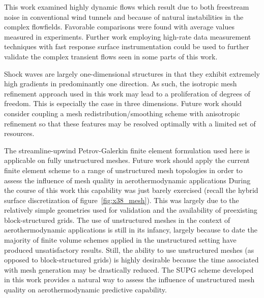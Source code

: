 This work examined highly dynamic flows which result due to both freestream noise in conventional wind tunnels and because of natural instabilities in the complex flowfields.  Favorable comparisons were found with average values measured in experiments.  Further work employing high-rate data measurement techniques with fast response surface instrumentation could be used to further validate the complex transient flows seen in some parts of this work.

Shock waves are largely one-dimensional structures in that they exhibit extremely high gradients in predominantly one direction.  As such, the isotropic mesh refinement approach used in this work may lead to a proliferation of degrees of freedom.  This is especially the case in three dimensions.  Future work should consider coupling a mesh redistribution/smoothing scheme with anisotropic refinement so that these features may be resolved optimally with a limited set of resources.

The streamline-upwind Petrov-Galerkin finite element formulation used here is applicable on fully unstructured meshes. Future work should apply the current finite element scheme to a range of unstructured mesh topologies in order to assess the influence of mesh quality in aerothermodynamic applications During the course of this work this capability was just barely exercised (recall the hybrid surface discretization of figure~\ref{fig:x38_mesh}).  This was largely due to the relatively simple geometries used for validation and the availability of preexisting block-structured grids.  The use of unstructured meshes in the context of aerothermodynamic applications is still in its infancy, largely because to date the majority of finite volume schemes applied in the unstructured setting have produced unsatisfactory results.  Still, the ability to use unstructured meshes (as opposed to block-structured grids) is highly desirable because the time associated with mesh generation may be drastically reduced.  The SUPG scheme developed in this work provides a natural way to assess the influence of unstructured mesh quality on aerothermodynamic predictive capability.




